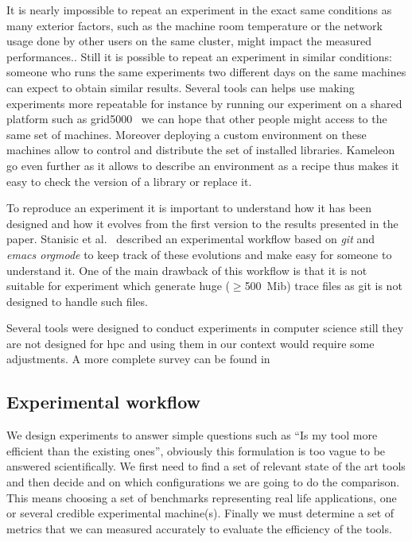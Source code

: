 It is nearly impossible to repeat an experiment in the exact same conditions
as many exterior factors, such as the machine room temperature or the network
usage done by other users on the same cluster, might impact the measured
performances..
Still it is possible to repeat an experiment in similar conditions: someone
who runs the same experiments two different days on the same machines can
expect to obtain similar results. Several tools can helps use making
experiments more repeatable for instance by running our experiment on a shared
platform such as grid5000~\cite{Cappello05Grid5000} we can hope that other
people might access to the same set of machines. Moreover deploying a custom
environment on these machines allow to control and distribute the set of
installed libraries. Kameleon~\cite{Ruiz15Reconstructable} go even
further as it allows to describe an environment as a recipe thus makes it easy
to check the version of a library or replace it.

To reproduce an experiment it is important to understand how it has been
designed and how it evolves from the first version to the results presented in
the paper. Stanisic et al.~\cite[Chapter~4, p31-44]{Stanisic15Reproducible}
described an experimental workflow based on \emph{git} and \emph{emacs orgmode}
to keep track of these evolutions and make easy for someone to understand it.
One of the main drawback of this workflow is that it is not suitable for
experiment which generate huge ($\ge$\SI{500}{Mib}) trace files as git is not
designed to handle such files.

Several tools were designed to conduct experiments in computer science still
they are not designed for \gls{hpc} and using them in our context would
require some adjustments. A more complete survey can be found
in~\cite[Chapter~3, p17-19]{Stanisic15Reproducible}

\subsection{Experimental workflow}

We design experiments to answer simple questions such as ``Is my tool more
efficient than the existing ones'', obviously this formulation is too vague to
be answered scientifically. We first need to find a set of relevant state of
the art tools and then decide and on which configurations we are going to do
the comparison. This means choosing a set of benchmarks representing real life
applications, one or several credible experimental machine(s). Finally we must
determine a set of metrics that we can measured accurately to evaluate the
efficiency of the tools.

